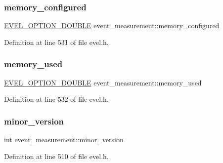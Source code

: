 \subsubsection{\texorpdfstring{memory\+\_\+configured}{memory\_configured}}
{\footnotesize\ttfamily \hyperlink{evel_8h_aafc42b3cd9aca88804c3d413e4ccec06}{E\+V\+E\+L\+\_\+\+O\+P\+T\+I\+O\+N\+\_\+\+D\+O\+U\+B\+LE} event\+\_\+measurement\+::memory\+\_\+configured}



Definition at line 531 of file evel.\+h.

\hypertarget{structevent__measurement_a0a3ac02cbc8ca1dcd3c0c498c8e751dd}{}\label{structevent__measurement_a0a3ac02cbc8ca1dcd3c0c498c8e751dd} 
\subsubsection{\texorpdfstring{memory\+\_\+used}{memory\_used}}
{\footnotesize\ttfamily \hyperlink{evel_8h_aafc42b3cd9aca88804c3d413e4ccec06}{E\+V\+E\+L\+\_\+\+O\+P\+T\+I\+O\+N\+\_\+\+D\+O\+U\+B\+LE} event\+\_\+measurement\+::memory\+\_\+used}



Definition at line 532 of file evel.\+h.

\hypertarget{structevent__measurement_aa785a4d498682a323d0e11e376860346}{}\label{structevent__measurement_aa785a4d498682a323d0e11e376860346} 
\subsubsection{\texorpdfstring{minor\+\_\+version}{minor\_version}}
{\footnotesize\ttfamily int event\+\_\+measurement\+::minor\+\_\+version}



Definition at line 510 of file evel.\+h.

\hypertarget{structevent__measurement_ac0967e30d7b1e0856e0a0008711ffb87}{}\label{structevent__measurement_ac0967e30d7b1e0856e0a0008711ffb87} 
